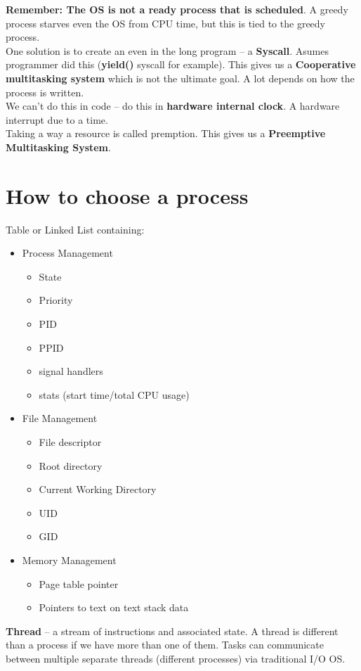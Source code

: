 \documentclass[../base_file/cs1550_notes.tex]{subfiles}
\begin{document}
\textbf{Remember: The OS is not a ready process that is scheduled}.  A greedy process starves even the OS
from CPU time, but this is tied to the greedy process.\\

One solution is to create an even in the long program -- a \textbf{Syscall}.  Asumes programmer did this
(\textbf{yield()} syscall for example).  This gives us a \textbf{Cooperative multitasking system} which 
is not the ultimate goal.  A lot depends on how the process is written.\\

We can't do this in code -- do this in \textbf{hardware internal clock}\@.  A hardware interrupt due to
a time.\\

Taking a way a resource is called premption. This gives us a \textbf{Preemptive Multitasking System}.

\section{How to choose a process}
Table or Linked List containing:
	\begin{multicols}{3}
	\begin{itemize}
	\item Process Management
   		\begin{itemize}
		\item State
		\item Priority
		\item PID
		\item PPID
		\item signal handlers
		\item stats (start time/total CPU usage)
		\end{itemize}
	\columnbreak
	\item File Management
		\begin{itemize}
		\item File descriptor
		\item Root directory
		\item Current Working Directory
		\item UID
		\item GID
		\end{itemize}
	\columnbreak
	\item Memory Management
		\begin{itemize}
		\item Page table pointer
		\item Pointers to text on text stack data
		\end{itemize}
	\end{itemize}
	\end{multicols}
\textbf{Thread} -- a stream of instructions and associated state\@.  A thread is different than a process if 
we have more than one of them\@. Tasks can communicate between multiple separate threads (different processes)
via traditional I/O OS\@.
\end{document}

